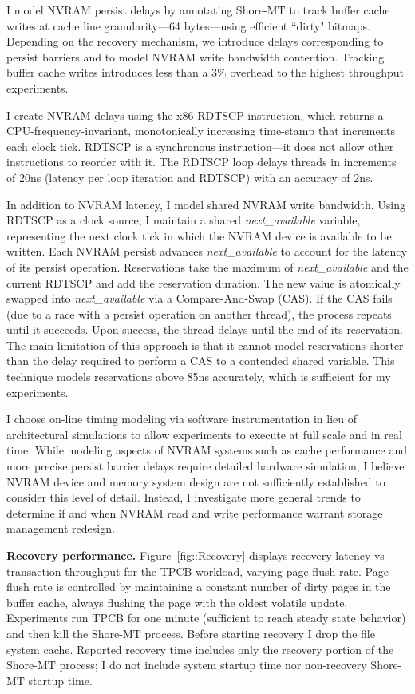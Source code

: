 I model NVRAM persist delays by annotating Shore-MT to track buffer cache writes at cache line granularity---64 bytes---using efficient ``dirty" bitmaps.
Depending on the recovery mechanism, we introduce delays corresponding to persist barriers and to model NVRAM write bandwidth contention.
Tracking buffer cache writes introduces less than a 3\% overhead to the highest throughput experiments.

I create NVRAM delays using the x86 RDTSCP instruction, which returns a CPU-frequency-invariant, monotonically increasing time-stamp that increments each clock tick.
RDTSCP is a synchronous instruction---it does not allow other instructions to reorder with it.
The RDTSCP loop delays threads in increments of 20ns (latency per loop iteration and RDTSCP) with an accuracy of 2ns.

In addition to NVRAM latency, I model shared NVRAM write bandwidth.
Using RDTSCP as a clock source, I maintain a shared \emph{next\_available} variable, representing the next clock tick in which the NVRAM device is available to be written.
Each NVRAM persist advances \emph{next\_available} to account for the latency of its persist operation.
Reservations take the maximum of \emph{next\_available} and the current RDTSCP and add the reservation duration.
The new value is atomically swapped into \emph{next\_available} via a Compare-And-Swap (CAS).
If the CAS fails (due to a race with a persist operation on another thread), the process repeats until it succeeds.
Upon success, the thread delays until the end of its reservation.
The main limitation of this approach is that it cannot model reservations shorter than the delay required to perform a CAS to a contended shared variable.
This technique models reservations above 85ns accurately, which is sufficient for my experiments.

I choose on-line timing modeling via software instrumentation in lieu of architectural simulations to allow experiments to execute at full scale and in real time.
While modeling aspects of NVRAM systems such as cache performance and more precise persist barrier delays require detailed hardware simulation, I believe NVRAM device and memory system design are not sufficiently established to consider this level of detail.
Instead, I investigate more general trends to determine if and when NVRAM read and write performance warrant storage management redesign.

\textbf{Recovery performance.} Figure~\ref{fig::Recovery} displays recovery latency vs transaction throughput for the TPCB workload, varying page flush rate.
Page flush rate is controlled by maintaining a constant number of dirty pages in the buffer cache, always flushing the page with the oldest volatile update.
Experiments run TPCB for one minute (sufficient to reach steady state behavior) and then kill the Shore-MT process.
Before starting recovery I drop the file system cache.
Reported recovery time includes only the recovery portion of the Shore-MT process; I do not include system startup time nor non-recovery Shore-MT startup time.

